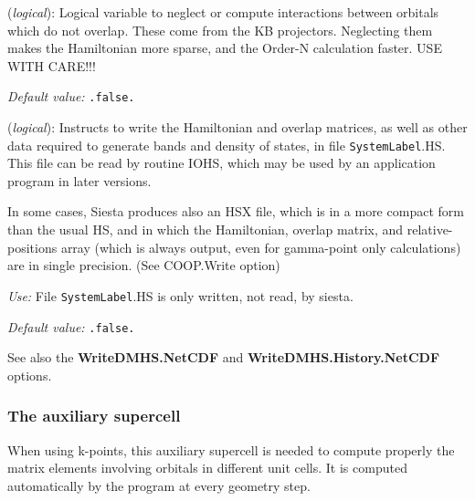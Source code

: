 \documentclass[11pt]{article}
\begin{document}
\begin{description}
\itemsep 10pt
\parsep 0pt

\item[{\bf NeglNonOverlapInt}] ({\it logical}):
Logical variable to neglect or compute interactions between orbitals
which do not overlap. These come from the KB projectors.
Neglecting them makes the Hamiltonian more sparse, and
the Order-N calculation faster.  USE WITH CARE!!!

{\it Default value:} {\tt .false.}

\item[{\bf SaveHS}] ({\it logical}):
Instructs to write the Hamiltonian and overlap matrices, as well
as other data required to generate bands and density of states,
in file {\tt SystemLabel}.HS. This file can be read by routine IOHS,
which may be used by an application program in later versions.

In some cases, {\sc Siesta} produces also an HSX file, which is in a
more compact form than the usual HS, and in which the Hamiltonian,
overlap matrix, and relative-positions array (which is always output,
even for gamma-point only calculations) are in single precision.
(See COOP.Write option)

{\it Use:} File {\tt SystemLabel}.HS is only written, not read, by siesta.

{\it Default value:} {\tt .false.}

See also the {\bf WriteDMHS.NetCDF} and {\bf WriteDMHS.History.NetCDF}
options.
\end{description}

\subsubsection{The auxiliary supercell}

When using k-points, this auxiliary supercell is needed to compute properly
the matrix elements involving orbitals in different unit cells.
It is computed automatically by the program at every geometry step.
\end{document}
